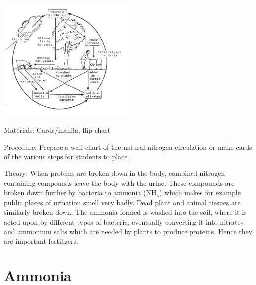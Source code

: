 \begin{multicols}{2}
\begin{center}
\includegraphics[width=0.49\textwidth]{./img/source/nitrogen-cycle.jpg}
\end{center}

\begin{description*}
\item[Materials:]{Cards/manila, flip chart}
\item[Procedure:]{Prepare a wall chart of the natural nitrogen
circulation or make cards of the various steps for students to place. }
\item[Theory:]{When proteins are broken down in
the body, combined nitrogen containing
compounds leave the body with the urine. These
compounds are broken down further by bacteria
to ammonia (NH$_4$) which makes for example
public places of urination smell very badly.
Dead plant and animal tissues are similarly
broken down. The ammonia formed is washed
into the soil, where it is acted upon by different
types of bacteria, eventually converting it into
nitrates and ammonium salts which are needed
by plants to produce proteins. Hence they are
important fertilizers.}
\end{description*}

\vfill
\columnbreak


\section*{Ammonia} 



\end{multicols}
